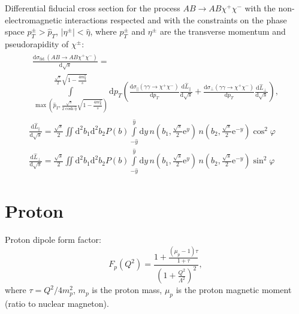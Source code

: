 \documentclass[a4paper,12pt]{article}
\newcommand{\abs}[1]{\lvert #1 \rvert}
\begin{document}
Differential fiducial cross section for the process $AB \to AB \chi^+ \chi^-$
with the non-electromagnetic interactions respected and with the constraints on
the phase space $p_T^\pm > \hat p_T$, $\abs{\eta^\pm} < \hat \eta$, where
$p_T^\pm$ and $\eta^\pm$ are the transverse momentum and pseudorapidity of
$\chi^\pm$:
\begin{gather}
  \begin{multlined}
    \frac{\mathrm{d} \sigma_\text{fid.}(AB \to AB \chi^+ \chi^-)}
         {\mathrm{d} \sqrt{s}}
    = \\ \int\limits_{
        \max \left(
          \hat p_T,
          \frac{\sqrt{s}}{2 \cosh \hat \eta} \sqrt{1 - \frac{4 m_\chi^2}{s}}
        \right)
      }^{\frac{\sqrt{s}}{2} \sqrt{1 - \frac{4 m_\chi^2}{s}}}
        \mathrm{d} p_T
        \left(
            \frac{\mathrm{d} \sigma_\parallel(\gamma \gamma \to \chi^+ \chi^-)}
                 {\mathrm{d} p_T}
            \frac{\mathrm{d} \hat L_\parallel}{\mathrm{d} \sqrt{s}}
          + \frac{\mathrm{d} \sigma_\perp(\gamma \gamma \to \chi^+ \chi^-)}
                 {\mathrm{d} p_T}
            \frac{\mathrm{d} \hat L_\perp}{\mathrm{d} \sqrt{s}}
        \right),
  \end{multlined}
  \\
  \frac{\mathrm{d} \hat L_\parallel}{\mathrm{d} \sqrt{s}}
  = \frac{\sqrt{s}}{2}
    \iint \mathrm{d}^2 b_1 \mathrm{d}^2 b_2 P(b)
    \int\limits_{-\hat y}^{\hat y} \mathrm{d} y
    \, n \left( b_1, \frac{\sqrt{s}}{2} \mathrm{e}^y    \right)
    \, n \left( b_2, \frac{\sqrt{s}}{2} \mathrm{e}^{-y} \right)
    \cos^2 \varphi
  \\
  \frac{\mathrm{d} \hat L_\perp}{\mathrm{d} \sqrt{s}}
  = \frac{\sqrt{s}}{2}
    \iint \mathrm{d}^2 b_1 \mathrm{d}^2 b_2 P(b)
    \int\limits_{-\hat y}^{\hat y} \mathrm{d} y
    \, n \left( b_1, \frac{\sqrt{s}}{2} \mathrm{e}^y    \right)
    \, n \left( b_2, \frac{\sqrt{s}}{2} \mathrm{e}^{-y} \right)
    \sin^2 \varphi
\end{gather}

\section{Proton}

Proton dipole form factor:
\begin{equation}
  F_p(Q^2)
  = \frac{1 + \frac{(\mu_p - 1) \tau}{1 + \tau}}
         {\left( 1 + \frac{Q^2}{\Lambda^2} \right)^2},
\end{equation}
where $\tau = Q^2 / 4 m_p^2$, $m_p$ is the proton mass, $\mu_p$ is the proton
magnetic moment (ratio to nuclear magneton).
\end{document}
